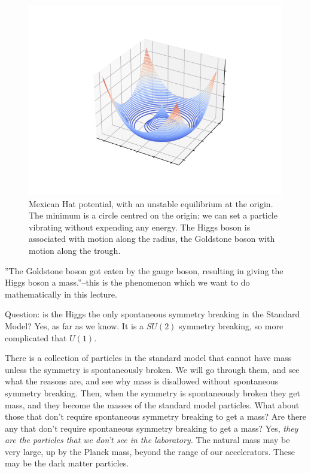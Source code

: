 \documentclass[]{article}
\begin{document}
\begin{figure}[H]
	\begin{center}
		\caption[Mexican Hat potential]{Mexican Hat potential, with an unstable equilibrium at the origin.  The minimum is a circle centred on the origin: we can set a particle vibrating without expending any energy. The Higgs boson is associated with motion along the radius, the Goldstone boson with motion along the trough.}\label{fig:mexican-hat}
		\includegraphics[width=\textwidth]{mexican-hat}
	\end{center}
\end{figure}

''The Goldstone boson got eaten by the gauge boson, resulting in giving the Higgs boson a mass.''--this is the phenomenon which we want to do mathematically in this lecture.

Question: is the Higgs the only spontaneous symmetry breaking in the Standard Model? Yes, as far as we know. It is a $SU(2)$ symmetry breaking, so more complicated that $U(1)$.

There is a collection of particles in the standard model that cannot have mass unless the symmetry is spontaneously  broken. We will go through them, and see what the reasons are, and see why mass is disallowed without spontaneous symmetry breaking. Then, when the symmetry is spontaneously  broken they get mass, and they become the masses of the standard model particles. What about those that don't require spontaneous symmetry breaking to get a mass? Are there any that don't require spontaneous symmetry breaking to get a mass? Yes, \emph{they are the particles that we don't see in the laboratory.} The natural mass may be very large, up by the Planck mass, beyond the range of our accelerators. These may be the dark matter particles.
\end{document}
